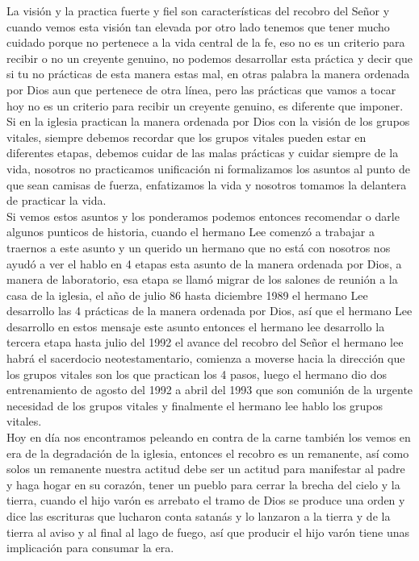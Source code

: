 \documentclass[12pt]{article}
\begin{document}
La visión y la practica fuerte y fiel son características del recobro del Señor y cuando vemos esta visión tan elevada por otro lado tenemos que tener mucho cuidado porque no pertenece a la vida central de la fe, eso no es un criterio para recibir o no un creyente genuino, no podemos desarrollar esta práctica y decir que si tu no prácticas de esta manera estas mal, en otras palabra la manera ordenada por Dios aun que pertenece de otra línea, pero las prácticas que vamos a tocar hoy no es un criterio para recibir un creyente genuino, es diferente que imponer.\\

Si en la iglesia practican la manera ordenada por Dios con la visión de los grupos vitales, siempre debemos recordar que los grupos vitales pueden estar en diferentes etapas, debemos cuidar de las malas prácticas y cuidar siempre de la vida, nosotros no practicamos unificación ni formalizamos los asuntos al punto de que sean camisas de fuerza, enfatizamos la vida y nosotros tomamos la delantera de practicar la vida.\\

Si vemos estos asuntos y los ponderamos podemos entonces recomendar o darle algunos punticos de historia, cuando el hermano Lee comenzó a trabajar a traernos a este asunto y un querido un hermano que no está con nosotros nos ayudó a ver el hablo en 4 etapas esta asunto de la manera ordenada por Dios, a manera de laboratorio, esa etapa se llamó migrar de los salones de reunión a la casa de la iglesia, el año de julio 86 hasta diciembre 1989 el hermano Lee desarrollo las 4 prácticas de la manera ordenada por Dios, así que el hermano Lee desarrollo en estos mensaje este asunto entonces el hermano lee desarrollo la tercera etapa hasta julio del 1992 el avance del recobro del Señor el hermano lee habrá el sacerdocio neotestamentario, comienza a moverse hacia la dirección que los grupos vitales son los que practican los 4 pasos, luego el hermano dio dos entrenamiento de agosto del 1992 a abril del 1993 que son comunión de la urgente necesidad de los grupos vitales y finalmente el hermano lee hablo los grupos vitales.\\

Hoy en día nos encontramos peleando en contra de la carne también los vemos en era de la degradación de la iglesia, entonces el recobro es un remanente, así como solos un remanente nuestra actitud debe ser un actitud para manifestar al padre y haga hogar en su corazón, tener un pueblo para cerrar la brecha del cielo y la tierra, cuando el hijo varón es arrebato el tramo de Dios se produce una orden y dice las escrituras que lucharon conta satanás y lo lanzaron a la tierra y de la tierra al aviso y al final al lago de fuego, así que producir el hijo varón tiene unas implicación para consumar la era.\\
\end{document}
